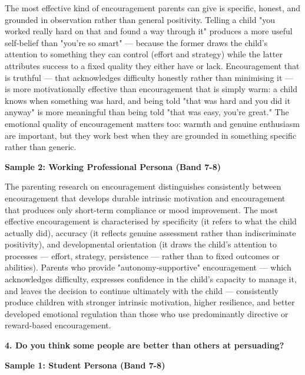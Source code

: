 The most effective kind of encouragement parents can give is specific, honest, and grounded in observation rather than general positivity. Telling a child "you worked really hard on that and found a way through it" produces a more useful self-belief than "you're so smart" — because the former draws the child's attention to something they can control (effort and strategy) while the latter attributes success to a fixed quality they either have or lack. Encouragement that is truthful — that acknowledges difficulty honestly rather than minimising it — is more motivationally effective than encouragement that is simply warm: a child knows when something was hard, and being told "that was hard and you did it anyway" is more meaningful than being told "that was easy, you're great." The emotional quality of encouragement matters too: warmth and genuine enthusiasm are important, but they work best when they are grounded in something specific rather than generic.

\textbf{Sample 2: Working Professional Persona (Band 7-8)}

The parenting research on encouragement distinguishes consistently between encouragement that develops durable intrinsic motivation and encouragement that produces only short-term compliance or mood improvement. The most effective encouragement is characterised by specificity (it refers to what the child actually did), accuracy (it reflects genuine assessment rather than indiscriminate positivity), and developmental orientation (it draws the child's attention to processes — effort, strategy, persistence — rather than to fixed outcomes or abilities). Parents who provide "autonomy-supportive" encouragement — which acknowledges difficulty, expresses confidence in the child's capacity to manage it, and leaves the decision to continue ultimately with the child — consistently produce children with stronger intrinsic motivation, higher resilience, and better developed emotional regulation than those who use predominantly directive or reward-based encouragement.

\separator

\begin{ieltsquestion}
\textbf{4. Do you think some people are better than others at persuading?}
\end{ieltsquestion}
\textbf{Sample 1: Student Persona (Band 7-8)}

